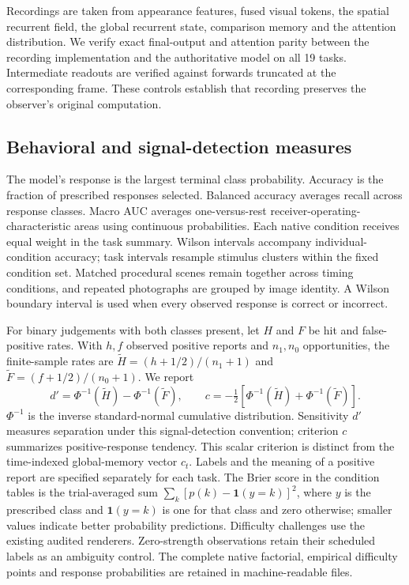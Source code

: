 \documentclass[11pt]{article}
\begin{document}
Recordings are taken from appearance features, fused visual tokens, the spatial recurrent field, the global recurrent state, comparison memory and the attention distribution. We verify exact final-output and attention parity between the recording implementation and the authoritative model on all 19 tasks. Intermediate readouts are verified against forwards truncated at the corresponding frame. These controls establish that recording preserves the observer's original computation.

\subsection{Behavioral and signal-detection measures}
The model's response is the largest terminal class probability. Accuracy is the fraction of prescribed responses selected. Balanced accuracy averages recall across response classes. Macro AUC averages one-versus-rest receiver-operating-characteristic areas using continuous probabilities. Each native condition receives equal weight in the task summary. Wilson intervals accompany individual-condition accuracy; task intervals resample stimulus clusters within the fixed condition set. Matched procedural scenes remain together across timing conditions, and repeated photographs are grouped by image identity. A Wilson boundary interval is used when every observed response is correct or incorrect.

For binary judgements with both classes present, let $H$ and $F$ be hit and false-positive rates. With $h,f$ observed positive reports and $n_1,n_0$ opportunities, the finite-sample rates are $\widetilde H=(h+1/2)/(n_1+1)$ and $\widetilde F=(f+1/2)/(n_0+1)$. We report
\begin{equation}
 d'=\Phi^{-1}(\widetilde H)-\Phi^{-1}(\widetilde F),\qquad
 c=-\tfrac12[\Phi^{-1}(\widetilde H)+\Phi^{-1}(\widetilde F)].
\end{equation}
$\Phi^{-1}$ is the inverse standard-normal cumulative distribution. Sensitivity $d'$ measures separation under this signal-detection convention; criterion $c$ summarizes positive-response tendency. This scalar criterion is distinct from the time-indexed global-memory vector $c_t$. Labels and the meaning of a positive report are specified separately for each task. The Brier score in the condition tables is the trial-averaged sum $\sum_k[p(k)-\mathbf 1(y=k)]^2$, where $y$ is the prescribed class and $\mathbf 1(y=k)$ is one for that class and zero otherwise; smaller values indicate better probability predictions. Difficulty challenges use the existing audited renderers. Zero-strength observations retain their scheduled labels as an ambiguity control. The complete native factorial, empirical difficulty points and response probabilities are retained in machine-readable files.
\end{document}
